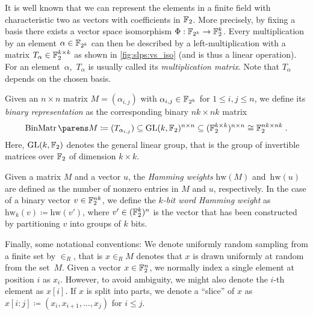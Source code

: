 It is well known that we can represent the elements in a finite field with characteristic two as vectors with coefficients in $\mathbb{F}_2$.
More precisely, by fixing a basis there exists a vector space isomorphism $\Phi: \mathbb{F}_{2^k} \to \mathbb{F}_2^k$.
Every multiplication by an element $\alpha \in \mathbb{F}_{2^k}$ can then be described by a left-multiplication with a matrix $T_{\alpha} \in \mathbb{F}_2^{k \times k}$ as shown in \cref{fig:slps:vs_iso} (and is thus a linear operation).
For an element~$\alpha$,~$T_{\alpha}$ is usually called its \emph{multiplication matrix}.
Note that $T_\alpha$ depends on the chosen basis.

Given an $n \times n$ matrix $M = (\alpha_{i,j})$ with $\alpha_{i,j} \in \mathbb{F}_{2^k}$ for $1 \leq i,j \leq n$, we define its \emph{binary representation} as the corresponding binary $nk \times nk$ matrix
\begin{equation*}
    \binarymatrix{M} \coloneqq (T_{\alpha_{i,j}}) \subseteq \GL{k}^{n \times n} \subseteq (\F_2^{k \times k})^{n \times n} \cong \F_2^{nk \times nk}\;.
\end{equation*}
Here, $\mathrm{GL}(k, \mathbb{F}_2)$ denotes the general linear group, that is the group of invertible matrices over $\mathbb{F}_2$ of dimension $k \times k$.

Given a matrix $M$ and a vector $u$, the \emph{Hamming weights} $\mathrm{hw}(M)$ and~$\mathrm{hw}(u)$ are defined as the number of nonzero entries in $M$ and $u$, respectively.
In the case of a binary vector $v \in \mathbb{F}_2^{nk}$, we define the \emph{$k$-bit word Hamming weight} as $\mathrm{hw}_k(v) \coloneqq \mathrm{hw}(v')$, where $v' \in (\mathbb{F}_2^k)^n$ is the vector that has been constructed by partitioning $v$ into groups of $k$ bits.

Finally, some notational conventions:
We denote uniformly random sampling from a finite set by $\in_R$, that is $x \in_R M$ denotes that $x$ is drawn uniformly at random from the set~$M$.
Given a vector $x \in \mathbb{F}_2^n$, we normally index a single element at position $i$ as $x_i$.
However, to avoid ambiguity, we might also denote the $i$-th element as $x[i]$.
If $x$ is split into parts, we denote a \enquote{slice} of $x$ as $x[i:j] \coloneqq (x_i, x_{i+1}, \ldots, x_j)$ for $i \leqslant j$.

